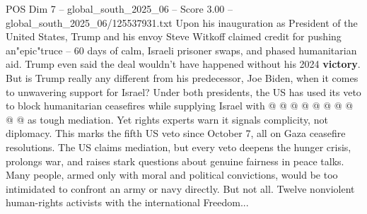 \begin{textsample}{POS Dim 7 – global\_south\_2025\_06 – Score 3.00 – global\_south\_2025\_06/125537931.txt}
Upon his inauguration as President of the United States, Trump and his envoy Steve Witkoff claimed credit for pushing an"epic"truce -- 60 days of calm, Israeli prisoner swaps, and phased humanitarian aid.
Trump even said the deal wouldn't have happened without his 2024 \textbf{victory}.
But is Trump really any different from his predecessor, Joe Biden, when it comes to unwavering support for Israel?
Under both presidents, the US has used its veto to block humanitarian ceasefires while supplying Israel with @ @ @ @ @ @ @ @ @ @ as tough mediation.
Yet rights experts warn it signals complicity, not diplomacy.
This marks the fifth US veto since October 7, all on Gaza ceasefire resolutions.
The US claims mediation, but every veto deepens the hunger crisis, prolongs war, and raises stark questions about genuine fairness in peace talks.
Many people, armed only with moral and political convictions, would be too intimidated to confront an army or navy directly.
But not all.
Twelve nonviolent human-rights activists with the international Freedom...

\end{textsample}
